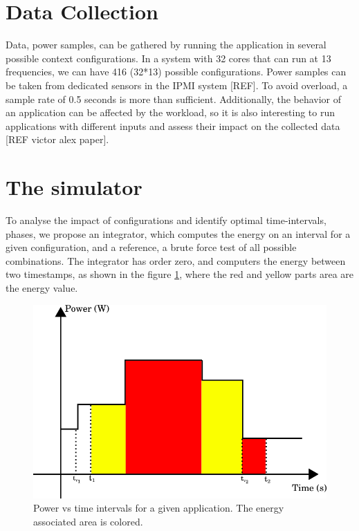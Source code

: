 \section{Data Collection} \label{sec:data_collection}
Data, power samples, can be gathered by running the application in several possible context configurations. In a system with 32 cores that can run at 13 frequencies, we can have 416 (32*13) possible configurations. Power samples can be taken from dedicated sensors in the IPMI system [REF]. To avoid overload, a sample rate of 0.5 seconds is more than sufficient. Additionally, the behavior of an application can be affected by the workload, so it is also interesting to run applications with different inputs and assess their impact on the collected data [REF victor alex paper].


\section{The simulator} \label{sec:the_simulator}
To analyse the impact of configurations and identify optimal time-intervals, phases, we propose an integrator, which computes the energy on an interval for a given configuration, and a reference, a brute force test of all possible combinations. The integrator has order zero, and computers the energy between two timestamps, as shown in the figure \ref{fig:zero_order}, where the red and yellow parts area are the energy value.


\begin{figure}[H]
    \centering
    \includegraphics[width=\columnwidth]{phases/figures/zero_order.png}
    \caption{Power vs time intervals for a given application. The energy associated area is colored.}
    \label{fig:zero_order}
\end{figure}

